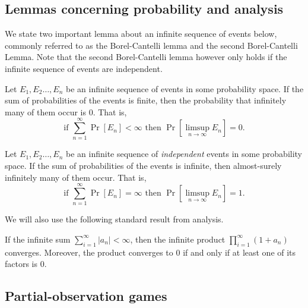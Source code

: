 \subsection{Lemmas concerning probability and analysis}\label{app:defs}
We state two important lemma about an infinite sequence of events below, commonly referred to as the Borel-Cantelli lemma and the second Borel-Cantelli Lemma. Note that the second Borel-Cantelli lemma however only holds if the infinite sequence of events are independent. 

\begin{lemma}\label{lemma:borellcantelli}
    Let $E_1,E_2\dots,E_n$ be an infinite sequence of events in some probability space. If the sum of probabilities of the events is finite, then the probability that infinitely many of them occur is $0$. That is, $$\text{if }\sum_{n=1}^\infty\Pr[E_n]<\infty \text{ then } \Pr[\limsup_{n\to\infty}E_n] = 0.$$
\end{lemma}
\begin{lemma}\label{lemma:secondborellcantelli}
      Let $E_1,E_2\dots,E_n$ be an infinite sequence of \emph{independent} events in some probability space. If the sum of probabilities of the events is infinite, then almost-surely infinitely many of them occur. That is, $$\text{if }\sum_{n=1}^\infty\Pr[E_n] = \infty \text{ then } \Pr[\limsup_{n\to\infty}E_n] = 1.$$  
\end{lemma}
We will also use the following standard result from analysis.
\begin{proposition}\label{prop:complexanalysisConverge}
If the infinite sum $\sum_{i=1}^\infty|a_n|<\infty$, then the infinite product $\prod_{i=1}^\infty(1+a_n)$ converges. Moreover, the product converges to 0 if and only if at least one of its factors is 0.
\end{proposition}

\subsection{Partial-observation games}

